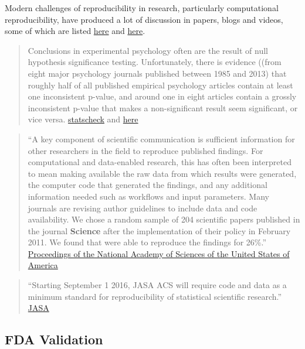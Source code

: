 \documentclass[]{book}
\theoremstyle{definition}
\theoremstyle{definition}
\theoremstyle{definition}
\theoremstyle{remark}
\begin{document}
Modern challenges of reproducibility in research, particularly
computational reproducibility, have produced a lot of discussion in
papers, blogs and videos, some of which are listed
\href{http://ropensci.github.io/reproducibility-guide/sections/references/}{here}
and \href{https://reproducibleresearch.net/}{here}.

\begin{quote}
Conclusions in experimental psychology often are the result of null
hypothesis significance testing. Unfortunately, there is evidence ((from
eight major psychology journals published between 1985 and 2013) that
roughly half of all published empirical psychology articles contain at
least one inconsistent p-value, and around one in eight articles contain
a grossly inconsistent p-value that makes a non-significant result seem
significant, or vice versa.
\href{https://mbnuijten.com/statcheck/}{statscheck} and
\href{http://blog.revolutionanalytics.com/2016/10/statcheck.html}{here}
\end{quote}

\begin{quote}
``A key component of scientific communication is sufficient information
for other researchers in the field to reproduce published findings. For
computational and data-enabled research, this has often been interpreted
to mean making available the raw data from which results were generated,
the computer code that generated the findings, and any additional
information needed such as workflows and input parameters. Many journals
are revising author guidelines to include data and code availability. We
chose a random sample of 204 scientific papers published in the journal
\textbf{Science} after the implementation of their policy in February
2011. We found that were able to reproduce the findings for 26\%.''
\href{http://www.pnas.org/content/115/11/2584}{Proceedings of the
National Academy of Sciences of the United States of America}
\end{quote}

\begin{quote}
``Starting September 1 2016, JASA ACS will require code and data as a
minimum standard for reproducibility of statistical scientific
research.''
\href{https://magazine.amstat.org/blog/2016/07/01/jasa-reproducible16/}{JASA}
\end{quote}

\subsection{FDA Validation}\label{fda-validation}
\end{document}
